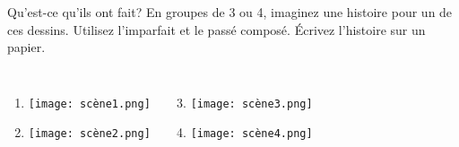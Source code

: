 \begin{frame}{Qu'est-ce qu'ils ont fait?}
  \small
  En groupes de 3 ou 4, imaginez une histoire pour un de ces dessins.
  Utilisez l'imparfait et le passé composé.
  Écrivez l'histoire sur un papier.
  \begin{columns}[t]
      \begin{enumerate}
        \item \texttt{[image: scène1.png]}
        \item \texttt{[image: scène2.png]}
      \end{enumerate}
      \begin{enumerate}
        \setcounter{enumi}{2}
        \item \texttt{[image: scène3.png]}
        \item \texttt{[image: scène4.png]}
      \end{enumerate}
  \end{columns}
\end{frame}